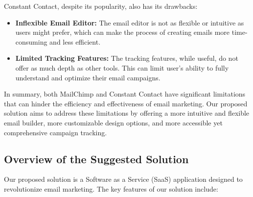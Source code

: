 Constant Contact, despite its popularity, also has its drawbacks:

\vspace{10pt}

\begin{itemize}
\item \textbf{Inflexible Email Editor:} The email editor is not as flexible or intuitive as users might prefer, which can make the process of creating emails more time-consuming and less efficient.
\item \textbf{Limited Tracking Features:} The tracking features, while useful, do not offer as much depth as other tools. This can limit user's ability to fully understand and optimize their email campaigns.
\end{itemize}

\vspace{10pt}

In summary, both MailChimp and Constant Contact have significant limitations that can hinder the efficiency and effectiveness of email marketing. Our proposed solution aims to address these limitations by offering a more intuitive and flexible email builder, more customizable design options, and more accessible yet comprehensive campaign tracking.


\subsection{Overview of the Suggested Solution}
Our proposed solution is a Software as a Service (SaaS) application designed to revolutionize email marketing. The key features of our solution include:

\vspace{10pt}

